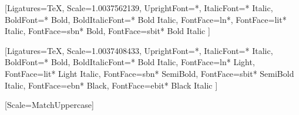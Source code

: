 \usepackage[margin=0.5in]{geometry}
\usepackage{calc}

\usepackage{fontspec}
\setmainfont{Times New Roman}
[Ligatures=TeX,
   Scale=1.0037562139,
   UprightFont=*,
   ItalicFont={* Italic},
   BoldFont={* Bold},
   BoldItalicFont={* Bold Italic},
   FontFace={l}{n}{*},
   FontFace={l}{it}{* Italic},
   FontFace={sb}{n}{* Bold},
   FontFace={sb}{it}{* Bold Italic}
  ]
\DeclareRobustCommand{\ltseries}{\fontseries{l}\selectfont}
\DeclareTextFontCommand{\textlt}{\ltseries}
\DeclareRobustCommand{\sbseries}{\fontseries{sb}\selectfont}
\DeclareTextFontCommand{\textsb}{\sbseries}

\setsansfont{Source Sans 3}
  [Ligatures=TeX,
   Scale=1.0037408433,
   UprightFont=*,
   ItalicFont={* Italic},
   BoldFont={* Bold},
   BoldItalicFont={* Bold Italic},
   FontFace={l}{n}{* Light},
   FontFace={l}{it}{* Light Italic},
   FontFace={sb}{n}{* SemiBold},
   FontFace={sb}{it}{* SemiBold Italic},
   FontFace={eb}{n}{* Black},
   FontFace={eb}{it}{* Black Italic}
  ]

\setmonofont{Source Code Pro}[Scale=MatchUppercase]

\usepackage[dvipsnames]{xcolor}

\usepackage{titling}
\setlength{\droptitle}{-3.5em}
\pretitle{\vspace{0.25in}\begin{center}\rmfamily\bfseries\color{themecolour}}
\posttitle{\par\end{center}\vspace{-2em}}
\preauthor{}
\author{}
\postauthor{}
\predate{}
\date{}
\postdate{}

\setlength{\defaultparindent}{\parindent}
\setlength{\parindent}{0em}
\setlength{\defaultparskip}{\parskip}
\setlength{\parskip}{1ex}

\usepackage[titles]{tocloft}
\setlength{\cftaftertoctitleskip}{1\parskip}
\setlength{\cftbeforesecskip}{0.5\parskip}
\setlength{\cftsecindent}{0pt}
\setlength{\cftsubsecindent}{1.5em}
\setlength{\cftsubsubsecindent}{1.5em}
\renewcommand{\cfttoctitlefont}{\LARGE\rmfamily\bfseries\color{themecolour}}
\renewcommand{\cftsecfont}{\normalsize\rmfamily}
\renewcommand{\cftsecpagefont}{\normalsize\rmfamily}
\renewcommand{\cftsubsecfont}{\normalsize\rmfamily\ltseries}
\renewcommand{\cftsubsecpagefont}{\normalsize\rmfamily\ltseries}
\renewcommand{\cftsubsubsecfont}{\normalsize\rmfamily\ltseries\itshape}
\renewcommand{\cftsubsubsecpagefont}{\normalsize\rmfamily\ltseries\itshape}

